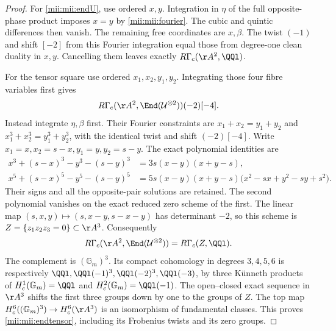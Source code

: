 \begin{proof}
For \eqref{mii:mii:endU}, use ordered $x,y$. Integration in $\eta$ of the
full opposite-phase product imposes $x=y$ by \eqref{mii:mii:fourier}.
The cubic and quintic differences then vanish. The remaining free
coordinates are $x,\beta$. The twist $(-1)$ and shift $[-2]$ from this
Fourier integration equal those from degree-one clean duality in $x,y$.
Cancelling them leaves exactly $R\Gamma_c(\AA^2,\QQl)$.

For the tensor square use ordered $x_1,x_2,y_1,y_2$. Integrating those
four fibre variables first gives
\[
 R\Gamma_c(\AA^2,\End(\mathcal U^{\otimes2}))(-2)[-4].
\]
Instead integrate $\eta,\beta$ first. Their Fourier constraints are
$x_1+x_2=y_1+y_2$ and $x_1^3+x_2^3=y_1^3+y_2^3$, with the identical
twist and shift $(-2)[-4]$. Write $x_1=x,x_2=s-x,y_1=y,y_2=s-y$.
The exact polynomial identities are
\begin{equation}\tag{MII12}\label{mii:mii:phasefactor}
 \begin{aligned}
 x^3+(s-x)^3-y^3-(s-y)^3
     &=3s(x-y)(x+y-s),\\
 x^5+(s-x)^5-y^5-(s-y)^5
     &=5s(x-y)(x+y-s)\bigl(x^2-sx+y^2-sy+s^2\bigr).
 \end{aligned}
\end{equation}
Their signs and all the opposite-pair solutions are retained. The
second polynomial vanishes on the exact reduced zero scheme of the
first. The linear map
$(s,x,y)\mapsto(s,x-y,s-x-y)$ has determinant $-2$, so this scheme
is $Z=\{z_1z_2z_3=0\}\subset\AA^3$. Consequently
\[
 R\Gamma_c(\AA^2,\End(\mathcal U^{\otimes2}))
       =R\Gamma_c(Z,\QQl).
\]
The complement is $(\mathbb G_m)^3$. Its compact cohomology in degrees
$3,4,5,6$ is respectively
$\QQl,\QQl(-1)^3,\QQl(-2)^3,\QQl(-3)$, by three K\"unneth products
of $H_c^1(\mathbb G_m)=\QQl$ and $H_c^2(\mathbb G_m)=\QQl(-1)$.
The open--closed exact sequence in $\AA^3$ shifts the first three
groups down by one to the groups of $Z$. The top map
$H_c^6((\mathbb G_m)^3)\to H_c^6(\AA^3)$ is an isomorphism of
fundamental classes. This proves \eqref{mii:mii:endtensor}, including its
Frobenius twists and its zero groups.


\end{proof}
